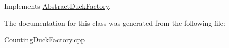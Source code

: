Implements \hyperlink{classAbstractDuckFactory_a978ebd6f631e2e610fa66d5f7c5628aa}{Abstract\-Duck\-Factory}.



The documentation for this class was generated from the following file\-:\begin{DoxyCompactItemize}
\item 
\hyperlink{CountingDuckFactory_8cpp}{Counting\-Duck\-Factory.\-cpp}\end{DoxyCompactItemize}
